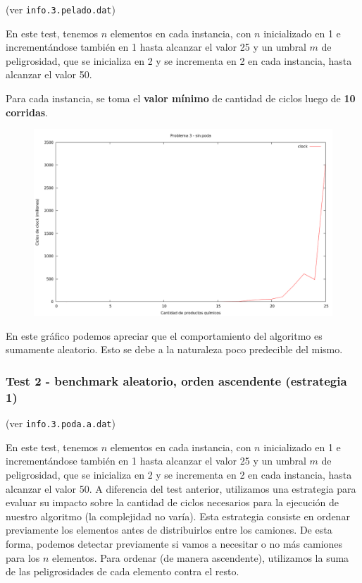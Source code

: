 (ver \verb|info.3.pelado.dat|) \medskip

En este test, tenemos $n$ elementos en cada instancia, con $n$ inicializado en 1 e incrementándose
también en 1 hasta alcanzar el valor 25 y un umbral $m$ de peligrosidad, que se inicializa en 2 y se incrementa
en 2 en cada instancia, hasta alcanzar el valor 50.

Para cada instancia, se toma el \textbf{valor mínimo} de cantidad de ciclos luego de \textbf{10 corridas}.

\vspace*{0.5cm}

\begin{figure}[h]
  \begin{center}
    \includegraphics[scale=0.35]{imagenes/grafico-3-pelado.png}
  \end{center}
\end{figure}

\vspace*{0.5cm}

En este gráfico podemos apreciar que el comportamiento del algoritmo es
sumamente aleatorio. Esto se debe a la naturaleza poco predecible del mismo.


\newpage
\subsubsection{Test 2 - benchmark aleatorio, orden ascendente (estrategia 1)}

(ver \verb|info.3.poda.a.dat|) \medskip

En este test, tenemos $n$ elementos en cada instancia, con $n$ inicializado en 1 e incrementándose
también en 1 hasta alcanzar el valor 25 y un umbral $m$ de peligrosidad, que se inicializa en 2 y se incrementa
en 2 en cada instancia, hasta alcanzar el valor 50. A diferencia del test anterior, utilizamos una
estrategia para evaluar su impacto sobre la cantidad de ciclos necesarios para la ejecución de
nuestro algoritmo (la complejidad no varía). Esta estrategia consiste en ordenar previamente los
elementos antes de distribuirlos entre los camiones. De esta forma, podemos detectar previamente
si vamos a necesitar o no más camiones para los $n$ elementos. Para ordenar (de manera ascendente),
utilizamos la suma de las peligrosidades de cada elemento contra el resto.

